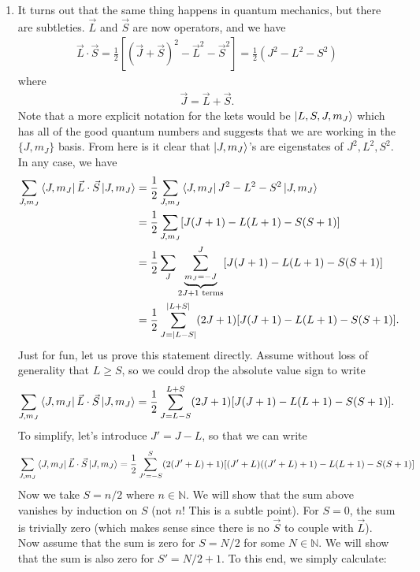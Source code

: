 \documentclass{article}
\theoremstyle{definition}
\newcommand{\f}[2]{\frac{#1}{#2}}
\newcommand{\lb}{\left[}
\newcommand{\rb}{\right]}
\begin{document}
\begin{enumerate}[label=(\alph*)]
	
	\item It turns out that the same thing happens in quantum mechanics, but there are subtleties. $\vec{L}$ and $\vec{S}$ are now operators, and we have
	\begin{align*}
	\vec{L}\cdot \vec{S} = \f{1}{2}\lb (\vec{J} + \vec{S})^2 - \vec{L}^2 - \vec{S}^2\rb = \f{1}{2}(J^2 - L^2 - S^2)
	\end{align*}
	where
	\begin{align*}
	\vec{J} = \vec{L} + \vec{S}.
	\end{align*}
	Note that a more explicit notation for the kets would be $\ket{L,S,J,m_J}$ which has all of the good quantum numbers and suggests that we are working in the $\{J,m_J\}$ basis. From here is it clear that $\ket{J,m_J}$'s are eigenstates of $J^2, L^2,S^2$.   In any case, we have 
	\begin{align*}
	\sum_{J,m_J} \bra{J,m_J} \vec{L}\cdot \vec{S} \ket{J,m_J} 
	&= \f{1}{2}\sum_{J,m_J} \bra{J,m_J} J^2 - L^2 - S^2 \ket{J,m_J}\\
	&= \f{1}{2}\sum_{J,m_J} [J(J+1) - L(L+1) - S(S+1)] \\
	&= \f{1}{2}\sum_{J} \underbrace{\sum_{m_J = -J}^J}_{2J+1 \text{ terms}}[J(J+1) - L(L+1) - S(S+1)] \\
	&= \f{1}{2} \sum_{J=\abs{L-S}}^{\abs{L+S}} (2J+1) [J(J+1) - L(L+1) - S(S+1)].
	\end{align*}
	Just for fun, let us prove this statement directly. Assume without loss of generality that $L\geq S$, so we could drop the absolute value sign to write
	\begin{align*}
	\sum_{J,m_J} \bra{J,m_J} \vec{L}\cdot \vec{S} \ket{J,m_J} = \f{1}{2} \sum_{J={L-S}}^{{L+S}} (2J+1) [J(J+1) - L(L+1) - S(S+1)].
	\end{align*}
	To simplify, let's introduce $J' = J-L$, so that we can write
	\begin{align*}
	\sum_{J,m_J} \bra{J,m_J} \vec{L}\cdot \vec{S} \ket{J,m_J} = \f{1}{2} \sum_{J'={-S}}^{{S}} (2 (J' + L) + 1)[(J' + L) ((J' + L) + 1) - L (L + 1) - S (S + 1)]
	\end{align*}
	Now we take $S = n/2$ where $n\in \mathbb{N}$. We will show that the sum above vanishes by induction on $S$ (not $n$! This is a subtle point). For $S=0$, the sum is trivially zero (which makes sense since there is no $\vec{S}$ to couple with $\vec{L}$). Now assume that the sum is zero for $S=N/2$ for some $N\in \mathbb{N}$. We will show that the sum is also zero for $S' = N/2+1$. To this end, we simply calculate:
	\begin{align*}

\end{align*}
\end{enumerate}
\end{document}
